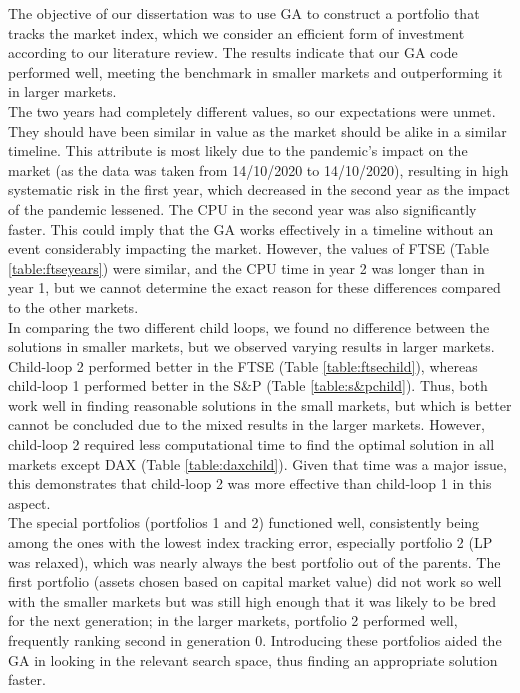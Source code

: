 \documentclass[12pt]{report}
\begin{document}
{The objective of our dissertation was to use GA to construct a portfolio that tracks the market index, which we consider an efficient form of investment according to our literature review. The results indicate that our GA code performed well, meeting the benchmark in smaller markets and outperforming it in larger markets.
\\ \newline \noindent
The two years had completely different values, so our expectations were unmet. They should have been similar in value as the market should be alike in a similar timeline. This attribute is most likely due to the pandemic’s impact on the market (as the data was taken from 14/10/2020 to 14/10/2020), resulting in high systematic risk in the first year, which decreased in the second year as the impact of the pandemic lessened. The CPU in the second year was also significantly faster. This could imply that the GA works effectively in a timeline without an event considerably impacting the market. However, the values of FTSE (Table \ref{table:ftseyears}) were similar, and the CPU time in year 2 was longer than in year 1, but we cannot determine the exact reason for these differences compared to the other markets.
\\ \newline \noindent 
In comparing the two different child loops, we found no difference between the solutions in smaller markets, but we observed varying results in larger markets. Child-loop 2 performed better in the FTSE (Table \ref{table:ftsechild}), whereas child-loop 1 performed better in the S\&P (Table \ref{table:s&pchild}). Thus, both work well in finding reasonable solutions in the small markets, but which is better cannot be concluded due to the mixed results in the larger markets. However, child-loop 2 required less computational time to find the optimal solution in all markets except DAX (Table \ref{table:daxchild}). Given that time was a major issue, this demonstrates that child-loop 2 was more effective than child-loop 1 in this aspect.
\\ \newline \noindent
The special portfolios (portfolios 1 and 2) functioned well, consistently being among the ones with the lowest index tracking error, especially portfolio 2 (LP was relaxed), which was nearly always the best portfolio out of the parents. The first portfolio (assets chosen based on capital market value) did not work so well with the smaller markets but was still high enough that it was likely to be bred for the next generation; in the larger markets, portfolio 2 performed well, frequently ranking second in generation 0. Introducing these portfolios aided the GA in looking in the relevant search space, thus finding an appropriate solution faster.
}
\end{document}
